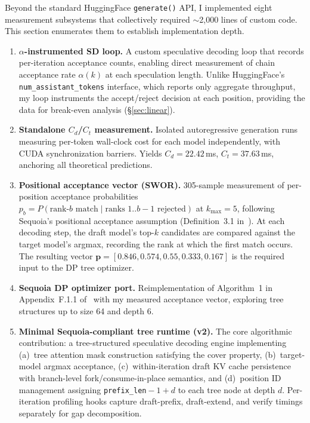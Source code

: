 \documentclass[letterpaper,twocolumn,10pt]{article}
\begin{document}
Beyond the standard HuggingFace \texttt{generate()} API, I implemented eight measurement subsystems that collectively required $\sim$2{,}000 lines of custom code.
This section enumerates them to establish implementation depth.

\begin{enumerate}
\itemsep=2pt
\item \textbf{$\alpha$-instrumented SD loop.}
A custom speculative decoding loop that records per-iteration acceptance counts, enabling direct measurement of chain acceptance rate $\alpha(k)$ at each speculation length.
Unlike HuggingFace's \texttt{num\_assistant\_tokens} interface, which reports only aggregate throughput, my loop instruments the accept/reject decision at each position, providing the data for break-even analysis (\S\ref{sec:linear}).

\item \textbf{Standalone $C_d$/$C_t$ measurement.}
Isolated autoregressive generation runs measuring per-token wall-clock cost for each model independently, with CUDA synchronization barriers.
Yields $C_d = 22.42$\,ms, $C_t = 37.63$\,ms, anchoring all theoretical predictions.

\item \textbf{Positional acceptance vector (SWOR).}
305-sample measurement of per-position acceptance probabilities $p_b = P(\text{rank-}b\text{ match} \mid \text{ranks } 1{..}b{-}1 \text{ rejected})$ at $k_{\max}=5$, following Sequoia's positional acceptance assumption (Definition~3.1 in~\cite{chen2024sequoia}).
At each decoding step, the draft model's top-$k$ candidates are compared against the target model's argmax, recording the rank at which the first match occurs.
The resulting vector $\mathbf{p} = [0.846, 0.574, 0.55, 0.333, 0.167]$ is the required input to the DP tree optimizer.

\item \textbf{Sequoia DP optimizer port.}
Reimplementation of Algorithm~1 in Appendix~F.1.1 of~\cite{chen2024sequoia} with my measured acceptance vector, exploring tree structures up to size 64 and depth 6.

\item \textbf{Minimal Sequoia-compliant tree runtime (v2).}
The core algorithmic contribution: a tree-structured speculative decoding engine implementing (a)~tree attention mask construction satisfying the cover property, (b)~target-model argmax acceptance, (c)~within-iteration draft KV cache persistence with branch-level fork/consume-in-place semantics, and (d)~position ID management assigning \texttt{prefix\_len}${} - 1 + d$ to each tree node at depth $d$.
Per-iteration profiling hooks capture draft-prefix, draft-extend, and verify timings separately for gap decomposition.


\end{enumerate}
\end{document}
